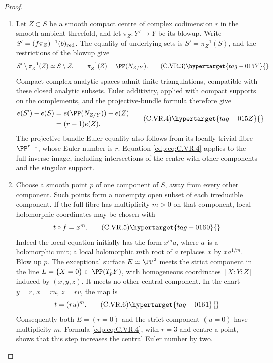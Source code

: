 \begin{proof}

\begin{enumerate}[label=\arabic*.,leftmargin=*]
\item Let $Z\subset S$ be a smooth compact
centre of complex codimension $r$ in the smooth ambient threefold,
and let $\pi_Z:Y'\to Y$ be its blowup. Write $S'=(f\pi_Z)^{-1}(b)_{\rm red}$.
The equality of underlying sets is $S'=\pi_Z^{-1}(S)$, and the
restrictions of the blowup give
\[
 S'\setminus\pi_Z^{-1}(Z)\simeq S\setminus Z,
 \qquad \pi_Z^{-1}(Z)=\PP(N_{Z/Y}).                \tag{C.VR.3}\hypertarget{tag-015Y}{}\label{cdp:eq:C.VR.3}
\]
Compact complex analytic spaces admit finite triangulations, compatible
with these closed analytic subsets. Euler additivity, applied with
compact supports on the complements, and the projective-bundle
formula therefore give
\[
 \begin{split}
 e(S')-e(S)
 &=e(\PP(N_{Z/Y}))-e(Z)\\
 &=(r-1)e(Z).
 \end{split}                                      \tag{C.VR.4}\hypertarget{tag-015Z}{}\label{cdp:eq:C.VR.4}
\]
The projective-bundle Euler equality also follows from its locally
trivial fibre $\PP^{r-1}$, whose Euler number is $r$.
Equation \eqref{cdp:eq:C.VR.4} applies to the full inverse image, including
intersections of the centre with other components and the singular support.

\item Choose a smooth point $p$ of one component of $S$, away from every
other component. Such points form a nonempty open subset of each
irreducible component. If the full fibre has multiplicity $m>0$ on
that component, local holomorphic coordinates may be chosen with
\[
                    t\circ f=x^m.                \tag{C.VR.5}\hypertarget{tag-0160}{}\label{cdp:eq:C.VR.5}
\]
Indeed the local equation initially has the form $x^m a$, where $a$
is a holomorphic unit; a local holomorphic $m$th root of $a$ replaces
$x$ by $x a^{1/m}$. Blow up $p$. The exceptional surface
$E\simeq\PP^2$ meets the strict component in the line
$L=\{X=0\}\subset\PP(T_pY)$, with homogeneous coordinates
$[X:Y:Z]$ induced by $(x,y,z)$. It meets no other central component.
In the chart $y=r$, $x=ru$, $z=rv$, the map is
\[
                         t=(ru)^m.                \tag{C.VR.6}\hypertarget{tag-0161}{}\label{cdp:eq:C.VR.6}
\]
Consequently both $E=(r=0)$ and the strict component $(u=0)$
have multiplicity $m$. Formula \eqref{cdp:eq:C.VR.4}, with $r=3$ and centre a
point, shows that this step increases the central Euler number by two.


\end{enumerate}
\end{proof}
